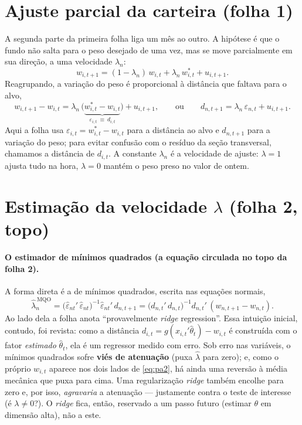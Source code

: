 \documentclass[11pt,a4paper]{article}
\begin{document}
\section{Ajuste parcial da carteira (folha 1)}

A segunda parte da primeira folha liga um mês ao outro. A hipótese é que o fundo não salta para o
peso desejado de uma vez, mas se move parcialmente em sua direção, a uma velocidade $\lambda_n$:
\begin{equation}
w_{i,t+1} = (1-\lambda_n)\,w_{i,t} + \lambda_n\,w^{*}_{i,t} + u_{i,t+1}.
\label{eq:pa1}
\end{equation}
Reagrupando, a variação do peso é proporcional à distância que faltava para o alvo,
\begin{equation}
w_{i,t+1} - w_{i,t} = \lambda_n\,\big(\underbrace{w^{*}_{i,t}-w_{i,t}}_{\displaystyle \varepsilon_{i,t}\ \equiv\ d_{i,t}}\big) + u_{i,t+1},
\qquad\text{ou}\qquad
d_{n,t+1} = \lambda_n\,\varepsilon_{n,t} + u_{i,t+1}.
\label{eq:pa2}
\end{equation}
Aqui a folha usa $\varepsilon_{i,t}=w^{*}_{i,t}-w_{i,t}$ para a distância ao alvo e $d_{n,t+1}$ para a
variação do peso; para evitar confusão com o resíduo da seção transversal, chamamos a distância de
$d_{i,t}$. A constante $\lambda_n$ é a velocidade de ajuste: $\lambda=1$ ajusta tudo na hora,
$\lambda=0$ mantém o peso preso no valor de ontem.

\section{Estimação da velocidade $\lambda$ (folha 2, topo)}

\paragraph{O estimador de mínimos quadrados (a equação circulada no topo da folha 2).} A forma
direta é a de mínimos quadrados, escrita nas equações normais,
\begin{equation}
\widehat{\lambda}^{\,\text{MQO}}_n = \big(\widehat{\varepsilon}_{nt}'\,\widehat{\varepsilon}_{nt}\big)^{-1}
\widehat{\varepsilon}_{nt}'\,d_{n,t+1}
= \big(d_{n,t}'\,d_{n,t}\big)^{-1} d_{n,t}'\,(w_{n,t+1}-w_{n,t}).
\label{eq:lambdaols}
\end{equation}
Ao lado dela a folha anota ``provavelmente \emph{ridge} regression''. Essa intuição inicial,
contudo, foi revista: como a distância $d_{i,t}=g(x_{i,t}'\widehat{\theta}_t)-w_{i,t}$ é construída
com o fator \emph{estimado} $\widehat{\theta}_t$, ela é um regressor medido com erro. Sob erro nas
variáveis, o mínimos quadrados sofre \textbf{viés de atenuação} (puxa $\widehat\lambda$ para zero);
e, como o próprio $w_{i,t}$ aparece nos dois lados de \eqref{eq:pa2}, há ainda uma reversão à média
mecânica que puxa para cima. Uma regularização \emph{ridge} também encolhe para zero e, por isso,
\emph{agravaria} a atenuação --- justamente contra o teste de interesse (é $\lambda\neq0$?). O
\emph{ridge} fica, então, reservado a um passo futuro (estimar $\theta$ em dimensão alta), não a
este.
\end{document}
